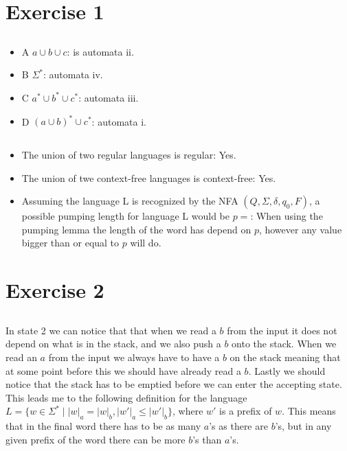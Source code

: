 \documentclass[12pt]{article}
\begin{document}
\maketitle

\section{Exercise 1}
\subsection{}
\begin{itemize}
        \item A $a \cup b \cup c$: is automata ii.
        \item B $\Sigma^*$: automata iv.
        \item C $a^* \cup b^* \cup c^*$: automata iii.
        \item D $(a \cup b)^* \cup c^*$: automata i.
\end{itemize}

\subsection{}
\begin{itemize}
        \item The union of two regular languages is regular: Yes.
        \item The union of twe context-free languages is context-free: Yes.
        \item Assuming the language L is recognized by the NFA $(Q, \Sigma, \delta, q_0, F)$, a possible pumping length for language L would be $p=$: When using the pumping lemma the length of the word has depend on $p$, however any value bigger than or equal to $p$ will do.
\end{itemize}

\section{Exercise 2}
\subsection{}
In state 2 we can notice that that when we read a $b$ from the input it does not depend on what is in the stack, and we also push a $b$ onto the stack. When we read an $a$ from the input we always have to have a $b$ on the stack meaning that at some point before this we should have already read a $b$. Lastly we should notice that the stack has to be emptied before we can enter the accepting state. This leads me to the following definition for the language $L = \{w \in \Sigma^* \mid |w|_a = |w|_b, |w'|_a \leq |w'|_b\}$, where $w'$ is a prefix of $w$. This means that in the final word there has to be as many $a$'s as there are $b$'s, but in any given prefix of the word there can be more $b$'s than $a$'s.
\end{document}
